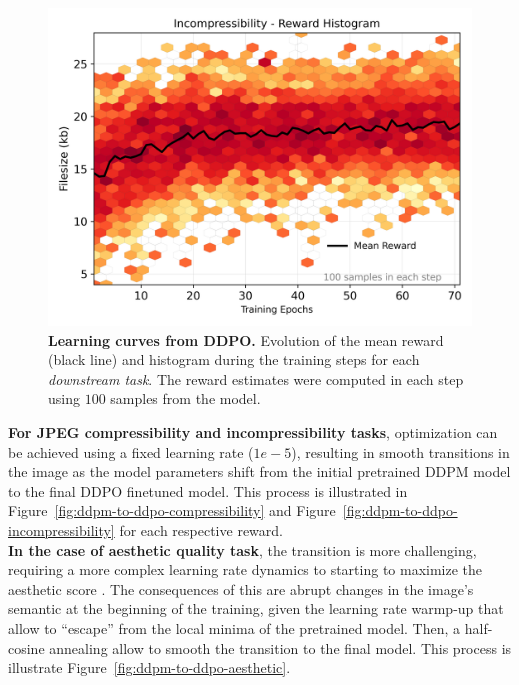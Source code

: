 \begin{figure}[ht]
\begin{minipage}{0.5\textwidth}
  \end{minipage}\hfill
  \begin{minipage}{0.5\textwidth}
      \centering
      \includegraphics[width=1\textwidth]{img/results/reward_hist-jpeg-incompressibility.png} %
  \end{minipage}
  \vspace{-8pt}  %
    \captionsetup{width=\textwidth} %
    \caption{\textbf{Learning curves from DDPO.} Evolution of the mean reward (black line) and histogram during the training steps for each \textit{downstream task}. The reward estimates were computed in each step using $100$ samples from the model.}
  \label{fig:reward_hist} %
\end{figure}

\noindent \textbf{For JPEG compressibility and incompressibility tasks}, optimization can be achieved using a fixed learning rate ($1e-5$), resulting in smooth transitions in the image as the model parameters shift from the initial  pretrained DDPM model to the final DDPO finetuned model. This process is  illustrated in Figure~\ref{fig:ddpm-to-ddpo-compressibility} and Figure~\ref{fig:ddpm-to-ddpo-incompressibility} for each respective reward. \\

\noindent \textbf{In the case of aesthetic quality task}, the transition is more challenging, requiring a more complex learning rate dynamics to starting to maximize the aesthetic score . The consequences of this are abrupt changes in the image's semantic at the beginning of the training, given the learning rate warmp-up that allow  to ``escape'' from the local minima of the pretrained model. Then, a half-cosine annealing allow to smooth the transition to the final model. This process is illustrate Figure~\ref{fig:ddpm-to-ddpo-aesthetic}. \\


